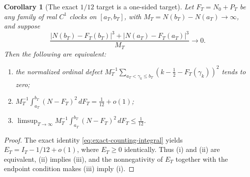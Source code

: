 \documentclass[11pt,reqno]{amsart}
\numberwithin{equation}{section}
\newtheorem{corollary}[theorem]{Corollary}
\begin{document}
\begin{corollary}[The exact $1/12$ target is a one-sided target]
\label{cor:v20OneSided}
Let $F_T=N_0+P_T$ be any family of real $C^1$ clocks on
$[a_T,b_T]$, with $M_T=N(b_T)-N(a_T)\to\infty$, and suppose
\[
\frac{|N(b_T)-F_T(b_T)|^3+|N(a_T)-F_T(a_T)|^3}{M_T}\to0.
\]
Then the following are equivalent:
\begin{enumerate}[label=(\roman*)]
\item the normalized ordinal defect $M_T^{-1}\sum_{a_T<\gamma_k\le b_T}
(k-\frac12-F_T(\gamma_k))^2$ tends to zero;
\item $M_T^{-1}\int_{a_T}^{b_T}(N-F_T)^2\,dF_T=\frac1{12}+o(1)$;
\item $\limsup_{T\to\infty}M_T^{-1}\int_{a_T}^{b_T}(N-F_T)^2\,dF_T
\le\frac1{12}$.
\end{enumerate}
\end{corollary}
\begin{proof}
The exact identity \eqref{eq:exact-counting-integral} yields
$E_T=I_T-1/12+o(1)$, where $E_T\ge0$ identically.  Thus (i)
and (ii) are equivalent, (ii) implies (iii), and the nonnegativity
of $E_T$ together with the endpoint condition makes (iii)
imply (i).
\end{proof}
\end{document}

